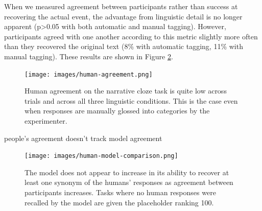 \documentclass[10pt,a4paper]{article}
\newcommand{\todo}[1]{{\color{red}#1}}
\begin{document}
When we measured agreement between participants rather than success at recovering the actual event, the advantage from linguistic detail is no longer apparent (p>0.05 with both automatic and manual tagging). However, participants agreed with one another according to this metric slightly more often than they recovered the original text (8\% with automatic tagging, 11\% with manual tagging). These results are shown in Figure \ref{fig:human-model-comparison}.


\begin{figure}
 \centering
 \texttt{[image: images/human-agreement.png]}
 \caption{Human agreement on the narrative cloze task is quite low across trials and across all three linguistic conditions. This is the case even when responses are manually glossed into categories by the experimenter.}
 \label{fig:human-agreement}
\end{figure}

\todo{people's agreement doesn't track model agreement}

% 
% 
% 
% 
% 

\begin{figure}
 \centering
 \texttt{[image: images/human-model-comparison.png]}
 \caption{The model does not appear to increase in its ability to recover at least one synonym of the humans' responses as agreement between participants increases. Tasks where no human responses were recalled by the model are given the placeholder ranking 100.}
 \label{fig:human-model-comparison}
\end{figure}
\end{document}
